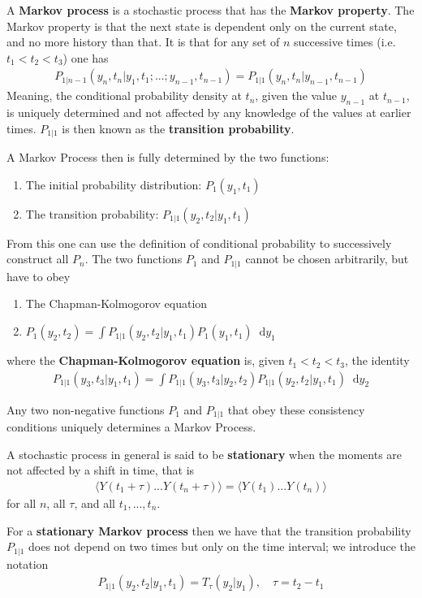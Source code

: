 \documentclass[twoside,english]{uiofysmaster}
\newcommand*\dif{\mathop{}\!\mathrm{d}}
\begin{document}
A \textbf{Markov process} is a stochastic process that has the \textbf{Markov property}. The Markov property is that the next state is dependent only on the current state, and no more history than that. It is that for any set of $n$ successive times (i.e. $t_1<t_2<t_3$) one has
\begin{align}
	P_{1|n-1} (y_n, t_n | y_1, t_1; ...; y_{n-1}, t_{n-1}) = P_{1|1} (y_n, t_n | y_{n-1}, t_{n-1})
\end{align}
Meaning, the conditional probability density at $t_n$, given the value $y_{n-1}$ at $t_{n-1}$, is uniquely determined and not affected by any knowledge of the values at earlier times. $P_{1|1}$ is then known as the \textbf{transition probability}.

A Markov Process then is fully determined by the two functions:
\begin{enumerate}
	\item The initial probability distribution: $P_1 (y_1, t_1)$
	\item The transition probability: $P_{1|1} (y_2, t_2| y_1, t_1)$ 
\end{enumerate}
From this one can use the definition of conditional probability to successively construct all $P_n$. The two functions $P_1$ and $P_{1|1}$ cannot be chosen arbitrarily, but have to obey
\begin{enumerate}
	\item The Chapman-Kolmogorov equation 
	\item $P_1(y_2, t_2) = \int P_{1|1} (y_2, t_2| y_1, t_1) P_1 (y_1, t_1) \dif y_1$
\end{enumerate}
where the \textbf{Chapman-Kolmogorov equation} is, given $t_1 < t_2 < t_3$, the identity
\begin{align}
	P_{1|1} (y_3, t_3| y_1, t_1) = \int P_{1|1} (y_3, t_3|y_2, t_2) P_{1|1} (y_2, t_2 | y_1, t_1) \dif y_2
\end{align}

Any two non-negative functions $P_1$ and $P_{1|1}$ that obey these consistency conditions uniquely determines a Markov Process.

A stochastic process in general is said to be \textbf{stationary} when the moments are not affected by a shift in time, that is
\begin{align}
	\langle Y(t_1 + \tau)...Y(t_n + \tau) \rangle = \langle Y(t_1 )...Y(t_n ) \rangle
\end{align}
for all $n$, all $\tau$, and all $t_1, ..., t_n$.

For a \textbf{stationary Markov process} then we have that the transition probability $P_{1|1}$ does not depend on two times but only on the time interval; we introduce the notation
\begin{align}
	P_{1|1} (y_2, t_2| y_1, t_1) = T_\tau (y_2|y_1), \quad \tau = t_2 - t_1
\end{align}
\end{document}
